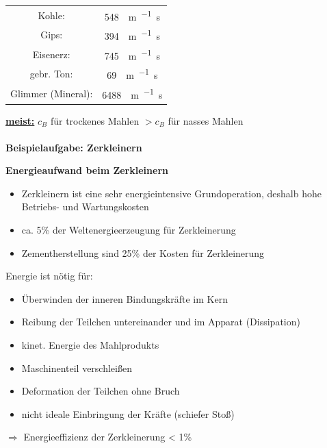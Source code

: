 \begin{table}[h!]
	\centering
		\begin{tabulary}{\textwidth}{C|C}
			\hline
			Kohle: & \SI{548}{\meter\per{}\second} \\   
			Gips:& \SI{394}{\meter\per{}\second} \\
			Eisenerz:&\SI{745}{\meter\per{}\second}\\ 
			gebr. Ton:&  \SI{69}{\meter\per{}\second}\\  
			Glimmer (Mineral):&\SI{6488}{\meter\per{}\second}\\
			\hline
	\end{tabulary}
\end{table}
\FloatBarrier

\underline{\textbf{meist:}} $c_B$ für trockenes Mahlen $> c_B$ für nasses Mahlen \\ \\

\large{\textbf{Beispielaufgabe: Zerkleinern}}

\newpage

\textbf{Energieaufwand beim Zerkleinern}
\begin{itemize}
 	\item Zerkleinern ist eine sehr energieintensive Grundoperation, deshalb hohe Betriebs- und Wartungskosten
 	\item ca. 5\% der Weltenergieerzeugung für Zerkleinerung
 	\item Zementherstellung sind 25\% der Kosten für Zerkleinerung
\end{itemize}
Energie ist nötig für:
\begin{itemize}
	\item Überwinden der inneren Bindungskräfte im Kern
	\item Reibung der Teilchen untereinander und im Apparat (Dissipation)
	\item kinet. Energie des Mahlprodukts
	\item Maschinenteil verschleißen
	\item Deformation der Teilchen ohne Bruch
	\item nicht ideale Einbringung der Kräfte (schiefer Stoß)	
\end{itemize}
$\Rightarrow$ Energieeffizienz der Zerkleinerung < 1\% 

